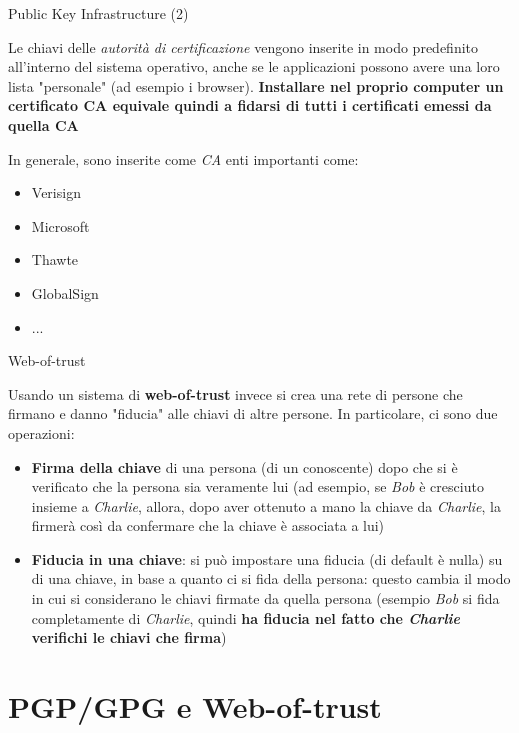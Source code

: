 \documentclass[10pt]{beamer}
\begin{document}
\begin{frame}{Public Key Infrastructure (2)}

Le chiavi delle \textit{autorità di certificazione} vengono inserite in modo predefinito all'interno del sistema operativo, anche se le applicazioni possono avere una loro lista "personale" (ad esempio i browser). \textbf{Installare nel proprio computer un certificato CA equivale quindi a fidarsi di tutti i certificati emessi da quella CA}

In generale, sono inserite come \textit{CA} enti importanti come:
\begin{itemize}
\item Verisign
\item Microsoft
\item Thawte
\item GlobalSign
\item ...
\end{itemize}

\end{frame}

\begin{frame}{Web-of-trust}

Usando un sistema di \textbf{web-of-trust} invece si crea una rete di persone che firmano e danno "fiducia" alle chiavi di altre persone. In particolare, ci sono due operazioni:

\begin{itemize}
\item \textbf{Firma della chiave} di una persona (di un conoscente) dopo che si è verificato che la persona sia veramente lui (ad esempio, se \textit{Bob} è cresciuto insieme a \textit{Charlie}, allora, dopo aver ottenuto a mano la chiave da \textit{Charlie}, la firmerà così da confermare che la chiave è associata a lui)
\item \textbf{Fiducia in una chiave}: si può impostare una fiducia (di default è nulla) su di una chiave, in base a quanto ci si fida della persona: questo cambia il modo in cui si considerano le chiavi firmate da quella persona (esempio \textit{Bob} si fida completamente di \textit{Charlie}, quindi \textbf{ha fiducia nel fatto che \textit{Charlie} verifichi le chiavi che firma})
\end{itemize}

\end{frame}

\section{PGP/GPG e Web-of-trust}
\end{document}
